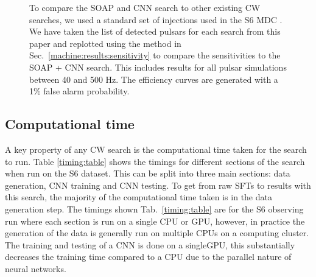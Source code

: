 \begin{figure}
	\caption[S6 \gls{MDC} results from SOAP and \gls{CNN} search.]{\label{machine:results:s6mdc} To compare the SOAP and \gls{CNN} search to other existing \gls{CW} searches, we used a standard set of injections used in the S6 \gls{MDC} \citep{walsh2016ComparisonMethods}.
	We have taken the list of detected pulsars for each search
	from this paper \citep{walsh2016ComparisonMethods} and replotted using the
	method in Sec.~\ref{machine:results:sensitivity} to compare the sensitivities to the SOAP + \gls{CNN} search. 
	This includes results for all pulsar simulations between 40 and 500 Hz. 
	The efficiency curves are generated with a 1\% false alarm probability. }
	
\end{figure}

\subsection{\label{machine:results:timing} Computational time}


A key property of any \gls{CW} search is the computational
time taken for the search to run. 
Table \ref{timing:table} shows the timings for different sections of the search when run on the S6 dataset. 
This can be split into three main sections: data generation, \gls{CNN} training and \gls{CNN} testing.
To get from raw \glspl{SFT} to results with this search, the majority of the computational time taken is in the data generation step.
The timings shown Tab.~\ref{timing:table} are for the S6 observing run where each section is run on a single \gls{CPU} or \gls{GPU}, however, in practice the generation of the data is generally run on multiple \glspl{CPU} on a computing cluster.
The training and testing of a \gls{CNN} is done on a single\gls{GPU}, this substantially decreases the training time compared to a \gls{CPU} due to the parallel nature of neural networks. 


